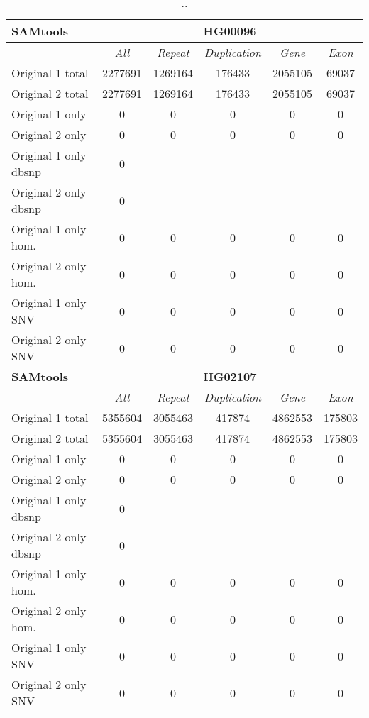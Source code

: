 \begin{table}[htb]
\begin{center}
\begin{tabular}{|l|c||c|c|c|c|}
\hline
{\bf SAMtools} & \multicolumn{5}{|c|}{\bf HG00096} \\
\hline
\cline{2-6}
{\bf} & {\it All} & {\it Repeat} & {\it Duplication} & {\it Gene} & {\it Exon} \\
\hline
Original 1 total & 2277691 & 1269164 & 176433 & 2055105 & 69037\\ 
\hline
Original 2 total & 2277691 & 1269164 & 176433 & 2055105 & 69037\\ 
\hline
Original 1 only & 0 & 0 & 0 & 0 & 0\\ 
\hline
Original 2 only & 0 & 0 & 0 & 0 & 0\\ 
\hline
Original 1 only dbsnp & 0 &  &  &  & \\ 
\hline
Original 2 only dbsnp & 0 &  &  &  & \\ 
\hline
Original 1 only hom. & 0 & 0 & 0 & 0 & 0\\ 
\hline
Original 2 only hom. & 0 & 0 & 0 & 0 & 0\\ 
\hline
Original 1 only SNV & 0 & 0 & 0 & 0 & 0\\ 
\hline
Original 2 only SNV & 0 & 0 & 0 & 0 & 0\\ 
\hline
\hline
{\bf SAMtools} & \multicolumn{5}{|c|}{\bf HG02107} \\
\hline
\cline{2-6}
{\bf} & {\it All} & {\it Repeat} & {\it Duplication} & {\it Gene} & {\it Exon} \\
\hline
Original 1 total & 5355604 & 3055463 & 417874 & 4862553 & 175803\\ 
\hline
Original 2 total & 5355604 & 3055463 & 417874 & 4862553 & 175803\\ 
\hline
Original 1 only & 0 & 0 & 0 & 0 & 0\\ 
\hline
Original 2 only & 0 & 0 & 0 & 0 & 0\\ 
\hline
Original 1 only dbsnp & 0 &  &  &  & \\ 
\hline
Original 2 only dbsnp & 0 &  &  &  & \\ 
\hline
Original 1 only hom. & 0 & 0 & 0 & 0 & 0\\ 
\hline
Original 2 only hom. & 0 & 0 & 0 & 0 & 0\\ 
\hline
Original 1 only SNV & 0 & 0 & 0 & 0 & 0\\ 
\hline
Original 2 only SNV & 0 & 0 & 0 & 0 & 0\\ 
\hline
\end{tabular}
\end{center}
\caption{ .. }
\label{tab:orig-vs-orig2-samtools}
\end{table}

